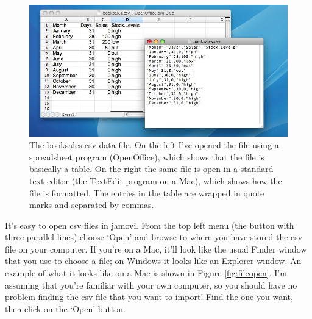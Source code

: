 \documentclass[
]{book}
\begin{document}
\begin{figure}

{\centering \includegraphics[width=1\linewidth]{img/mechanics/booksalescsv} 

}

\caption{The booksales.csv data file. On the left I’ve opened the file using a spreadsheet program (OpenOffice), which shows that the file is basically a table. On the right the same file is open in a standard text editor (the TextEdit program on a Mac), which shows how the file is formatted. The entries in the table are wrapped in quote marks and separated by commas.}\label{fig:booksalescsv}
\end{figure}

It's easy to open csv files in jamovi. From the top left menu (the button with three parallel lines) choose `Open' and browse to where you have stored the csv file on your computer. If you're on a Mac, it'll look like the usual Finder window that you use to choose a file; on Windows it looks like an Explorer window. An example of what it looks like on a Mac is shown in Figure \ref{fig:fileopen}. I'm assuming that you're familiar with your own computer, so you should have no problem finding the csv file that you want to import! Find the one you want, then click on the `Open' button.
\end{document}
